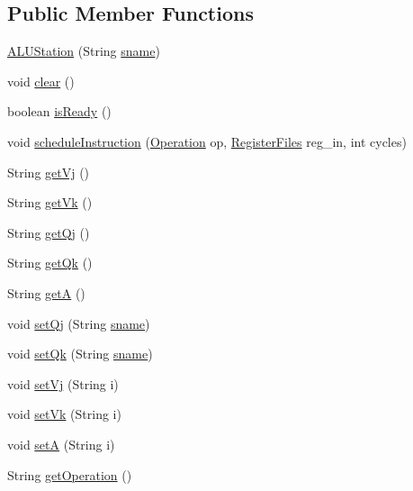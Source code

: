 \subsection*{\-Public \-Member \-Functions}
\begin{DoxyCompactItemize}
\item 
\hyperlink{classALUStation_ad072a1418f290945613c341e10e2790f}{\-A\-L\-U\-Station} (\-String \hyperlink{classReservationStation_a2c0bd5b95f126395b0ab081394f090f6}{sname})
\item 
void \hyperlink{classALUStation_a2fa486045af0a1ceea0cc089f1d7c285}{clear} ()
\item 
boolean \hyperlink{classALUStation_a5594f76ac16f7d0ee029759a8aa0e95b}{is\-Ready} ()
\item 
void \hyperlink{classALUStation_a7390a161d8b942caf223b17ea3c10eaf}{schedule\-Instruction} (\hyperlink{classOperation}{\-Operation} op, \hyperlink{classRegisterFiles}{\-Register\-Files} reg\-\_\-in, int cycles)
\item 
\-String \hyperlink{classALUStation_a3994abd08bd21c0909e618fccfa71232}{get\-Vj} ()
\item 
\-String \hyperlink{classALUStation_a9ccb24522168da4e49c73181713456c5}{get\-Vk} ()
\item 
\-String \hyperlink{classALUStation_ae0a7442f52e927afe64ea6d2c4c4ce35}{get\-Qj} ()
\item 
\-String \hyperlink{classALUStation_a37809dac94705eb79f8e86edd500df93}{get\-Qk} ()
\item 
\-String \hyperlink{classALUStation_a9fc599d8a1cc18e346f8906b89f99826}{get\-A} ()
\item 
void \hyperlink{classALUStation_a28b3efd541c418802585a67ff2c1ee4a}{set\-Qj} (\-String \hyperlink{classReservationStation_a2c0bd5b95f126395b0ab081394f090f6}{sname})
\item 
void \hyperlink{classALUStation_aa9c34c3462cf28b45ca0aee15720a6a7}{set\-Qk} (\-String \hyperlink{classReservationStation_a2c0bd5b95f126395b0ab081394f090f6}{sname})
\item 
void \hyperlink{classALUStation_af5cf876f7797834ded145c7d1399a9d6}{set\-Vj} (\-String i)
\item 
void \hyperlink{classALUStation_ab49be93fcb73de71abd3d26b8cad9d0d}{set\-Vk} (\-String i)
\item 
void \hyperlink{classALUStation_a3f3398c9971fcef712be2b1d30ef7fde}{set\-A} (\-String i)
\item 
\-String \hyperlink{classALUStation_a7e8a7ef42658641d2ec67f4c6284e4f7}{get\-Operation} ()
\end{DoxyCompactItemize}
